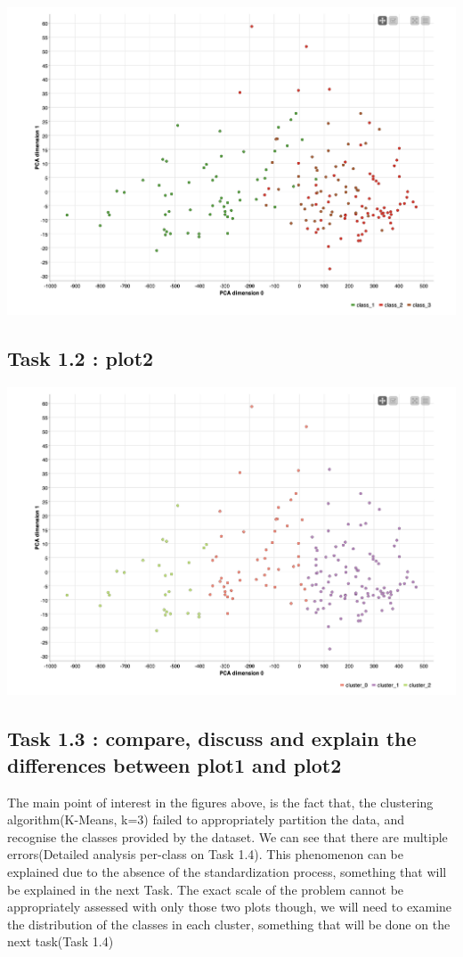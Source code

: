 \documentclass[12pt]{article}
\begin{document}
	 	\includegraphics[scale=0.36]{res/plot1.1}
	 
	 \subsection*{Task 1.2 : plot2}
	 
	 	\includegraphics[scale=0.36]{res/plot1.2}
	 
	 \subsection*{Task 1.3 : compare, discuss and explain the differences between plot1 and plot2}
		The main point of interest in the figures above, is the fact that, the clustering algorithm(K-Means, k=3) failed to appropriately partition the data, and recognise the classes provided by the dataset. We can see that there are multiple errors(Detailed analysis per-class on Task 1.4). This phenomenon can be explained due to the absence of the standardization process, something that will be explained in the next Task. The exact scale of the problem cannot be appropriately assessed with only those two plots though, we will need to examine the distribution of the classes in each cluster, something that will be done on the next task(Task 1.4)
	
\end{document}
